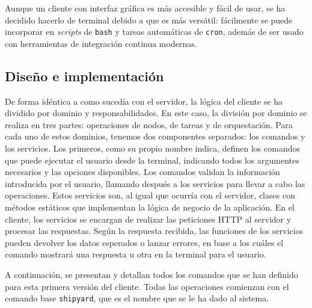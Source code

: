 Aunque un cliente con interfaz gráfica es más accesible y fácil de usar, se ha
decidido hacerlo de terminal debido a que es más versátil: fácilmente se puede
incorporar en \textit{scripts} de \texttt{bash} y tareas automáticas de
\texttt{cron}, además de ser usado con herramientas de integración continua
modernas.

\subsection{Diseño e implementación}

De forma idéntica a como sucedía con el servidor, la lógica del cliente se ha
dividido por dominio y responsabilidades. En este caso, la división por dominio
se realiza en tres partes: operaciones de nodos, de tareas y de orquestación.
Para cada uno de estos dominios, tenemos dos componentes separados: los comandos
y los servicios. Los primeros, como su propio nombre indica, definen los
comandos que puede ejecutar el usuario desde la terminal, indicando todos los
argumentes necesarios y las opciones disponibles. Los comandos validan la
información introducida por el usuario, llamando después a los servicios para
llevar a cabo las operaciones. Estos servicios son, al igual que ocurría con el
servidor, clases con métodos estáticos que implementan la lógica de negocio de
la aplicación. En el cliente, los servicios se encargan de realizar las
peticiones HTTP al servidor y procesar las respuestas. Según la respuesta
recibida, las funciones de los servicios pueden devolver los datos esperados o
lanzar errores, en base a los cuáles el comando mostrará una respuesta u otra en
la terminal para el usuario.

A continuación, se presentan y detallan todos los comandos que se han definido
para esta primera versión del cliente. Todas las operaciones comienzan con el
comando base \texttt{shipyard}, que es el nombre que se le ha dado al sistema.

